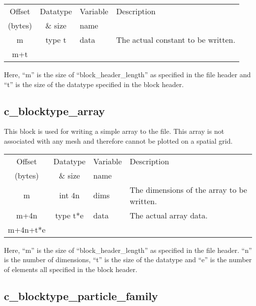 \documentclass[12pt]{article}
\begin{document}
\begin{center}
\begin{tabularx}{0.9\textwidth}[!hbt]{cclX}
  Offset & Datatype & Variable & Description\\
  (bytes) & \& size & name &
  \\\toprule

  m & type t & data & The actual constant to be written.
  \\\midrule

  m+t &
\end{tabularx}
\end{center}\vspace{10pt}

Here, ``m'' is the size of ``block\_header\_length'' as specified in the file
header and ``t'' is the size of the datatype specified in the block header.

\subsection{c\_blocktype\_array}

This block is used for writing a simple array to the file. This array
is not associated with any mesh and therefore cannot be plotted on a
spatial grid.\\

\begin{center}
\begin{tabularx}{0.9\textwidth}[!hbt]{cclX}
  Offset & Datatype & Variable & Description\\
  (bytes) & \& size & name &
  \\\toprule

  m & int 4n & dims & The dimensions of the array to be written.
  \\\midrule

  m+4n & type t*e & data & The actual array data.
  \\\midrule

  m+4n+t*e &
\end{tabularx}
\end{center}\vspace{10pt}

Here, ``m'' is the size of ``block\_header\_length'' as specified in the file
header.  ``n'' is the number of dimensions, ``t'' is the size of the datatype
and ``e'' is the number of elements all specified in the block header.

\subsection{c\_blocktype\_particle\_family}
\end{document}
